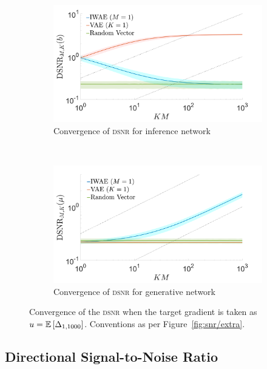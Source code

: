 \begin{figure}[t]
	\centering
	\begin{subfigure}[b]{0.4\textwidth}
		\centering
		\includegraphics[width=\textwidth]{figures/tighter_bounds/dir_snr_end}
		\caption{Convergence of \textsc{dsnr} for inference network\label{fig:snr/snr_dir_end}}
	\end{subfigure} ~~~~~~~~~~~~~~
	\begin{subfigure}[b]{0.4\textwidth}
		\centering
		\includegraphics[width=\textwidth]{figures/tighter_bounds/dir_snr_mu_end}
		\caption{Convergence of \textsc{dsnr} for generative network\label{fig:snr/snr_dir_mu_end}}
	\end{subfigure}
	\caption{Convergence of the \textsc{dsnr} when the
		target gradient is taken as $u = \mathbb{E} \left[\Delta_{1,1000}\right]$.  Conventions as
		per Figure~\ref{fig:snr/extra}.
		\label{fig:snr/extra_end}}
\end{figure}


\subsection{Directional Signal-to-Noise Ratio}

